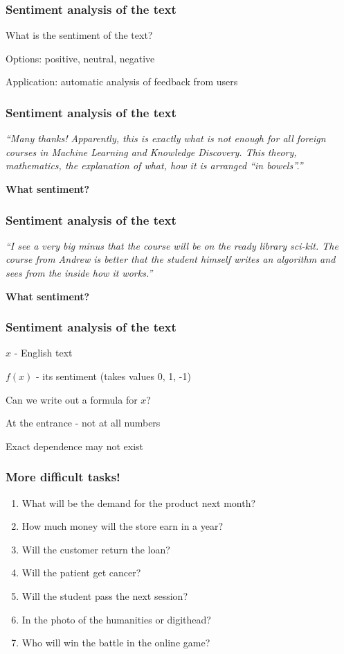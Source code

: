 \documentclass[default]{beamer}
\begin{document}
	\begin{frame}
		\frametitle{Sentiment analysis of the text}
		
		\Large
		What is the sentiment of the text?
		
		Options: positive, neutral, negative
		
		Application: automatic analysis of feedback from users
	\end{frame}

	\begin{frame}
		\frametitle{Sentiment analysis of the text}
		
		\Large
		\textit{``Many thanks! Apparently, this is exactly what is not enough for all foreign courses in Machine Learning and Knowledge Discovery. This theory, mathematics, the explanation of what, how it is arranged ``in bowels''.''}
		
		\textbf{What sentiment?}
	\end{frame}

	\begin{frame}
		\frametitle{Sentiment analysis of the text}
		
		\Large
		\textit{``I see a very big minus that the course will be on the ready library sci-kit. The course from Andrew is better that the student himself writes an algorithm and sees from the inside how it works.''}
		
		\textbf{What sentiment?}
	\end{frame}

	\begin{frame}
		\frametitle{Sentiment analysis of the text}
		
		\Large
		$x$ - English text
		
		$f(x)$ - its sentiment (takes values 0, 1, -1)
		
		Can we write out a formula for $x$?
		
		\vspace*{30pt}
		
		At the entrance - not at all numbers
		
		Exact dependence may not exist
	\end{frame}

	\begin{frame}
		\frametitle{More difficult tasks!}
		\Large
		\begin{enumerate}
			\item What will be the demand for the product next month?
			\item How much money will the store earn in a year?
			\item Will the customer return the loan?
			\item Will the patient get cancer?
			\item Will the student pass the next session?
			\item In the photo of the humanities or digithead?
			\item Who will win the battle in the online game?
		\end{enumerate}
		
	\end{frame}
\end{document}
